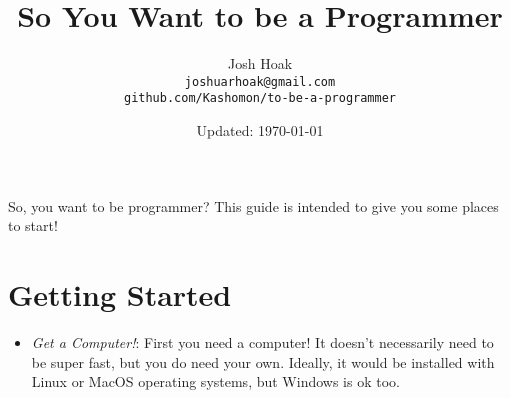 \documentclass{article}
\title{So You Want to be a Programmer}
\author{Josh Hoak \\ \texttt{joshuarhoak@gmail.com} \\\texttt{github.com/Kashomon/to-be-a-programmer}}
\date{Updated: \today}
\begin{document}
\maketitle

So, you want to be programmer? This guide is intended to give you some places to start!

\section*{Getting Started}

\begin{itemize}
\item \textit{Get a Computer!}: First you need a computer! It doesn't
necessarily need to be super fast, but you do need your own. Ideally, it would
be installed with Linux or MacOS operating systems, but Windows is ok too.


\end{itemize}
\end{document}

